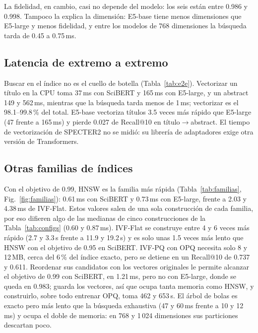 \documentclass[runningheads]{llncs}
\begin{document}
La fidelidad, en cambio, casi no depende del modelo: los seis están entre 0.986 y 0.998.
Tampoco la explica la dimensión: E5-base tiene menos dimensiones que E5-large y menos
fidelidad, y entre los modelos de 768 dimensiones la búsqueda tarda de 0.45 a 0.75\,ms.





\subsection{Latencia de extremo a extremo}

Buscar en el índice no es el cuello de botella (Tabla~\ref{tab:e2e}). Vectorizar un título en
la CPU toma 37\,ms con SciBERT y 165\,ms con E5-large, y un abstract 149 y 562\,ms, mientras
que la búsqueda tarda menos de 1\,ms; vectorizar es el 98.1--99.8\,\% del total. E5-base
vectoriza títulos 3.5 veces más rápido que E5-large (47 frente a 165\,ms) y pierde 0.027 de
Recall@10 en título$\rightarrow$abstract. El tiempo de vectorización de SPECTER2 no se midió:
su librería de adaptadores exige otra versión de Transformers.



\subsection{Otras familias de índices}

Con el objetivo de 0.99, HNSW es la familia más rápida (Tabla~\ref{tab:familias},
Fig.~\ref{fig:familias}): 0.61\,ms con SciBERT y 0.73\,ms con E5-large, frente a 2.03 y
4.38\,ms de IVF-Flat. Estos valores salen de una sola construcción de cada familia, por eso
difieren algo de las medianas de cinco construcciones de la Tabla~\ref{tab:configs} (0.60 y
0.87\,ms). IVF-Flat se construye entre 4 y 6 veces más rápido (2.7 y 3.3\,s frente a 11.9 y
19.2\,s) y es solo unas 1.5 veces más lento que HNSW con el objetivo de 0.95 en SciBERT. IVF-PQ
con OPQ necesita solo 8 y 12\,MB, cerca del 6\,\% del índice exacto, pero se detiene en un
Recall@10 de 0.737 y 0.611. Reordenar sus candidatos con los vectores originales le permite
alcanzar el objetivo de 0.99 con SciBERT, en 1.21\,ms, pero no con E5-large, donde se queda en
0.983; guarda los vectores, así que ocupa tanta memoria como HNSW, y construirlo, sobre todo entrenar OPQ, toma 462 y 653\,s.
El árbol de bolas es exacto pero más lento que la búsqueda exhaustiva (47 y 60\,ms frente a 10
y 12\,ms) y ocupa el doble de memoria: en 768 y 1\,024 dimensiones sus particiones descartan
poco.
\end{document}
